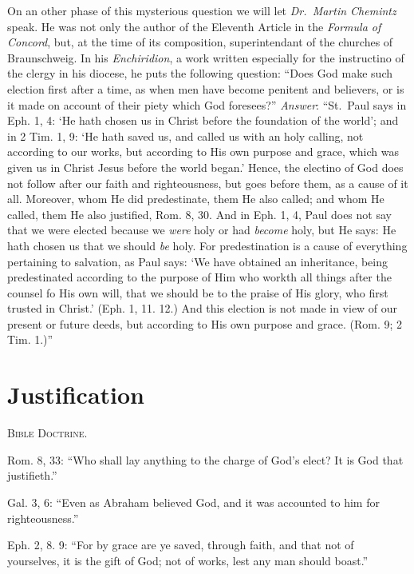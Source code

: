 \documentclass[
]{book}
\begin{document}
On an other phase of this mysterious question we will let \emph{Dr.~Martin Chemintz} speak. He was not only the author of the Eleventh Article in the \emph{Formula of Concord}, but, at the time of its composition, superintendant of the churches of Braunschweig. In his \emph{Enchiridion}, a work written especially for the instructino of the clergy in his diocese, he puts the following question: ``Does God make such election first after a time, as when men have become penitent and believers, or is it made on account of their piety which God foresees?'' \emph{Answer}: ``St.~Paul says in Eph. 1, 4: `He hath chosen us in Christ before the foundation of the world'; and in 2 Tim. 1, 9: `He hath saved us, and called us with an holy calling, not according to our works, but according to His own purpose and grace, which was given us in Christ Jesus before the world began.' Hence, the electino of God does not follow after our faith and righteousness, but goes before them, as a cause of it all. Moreover, whom He did predestinate, them He also called; and whom He called, them He also justified, Rom. 8, 30. And in Eph. 1, 4, Paul does not say that we were elected because we \emph{were} holy or had \emph{become} holy, but He says: He hath chosen us that we should \emph{be} holy. For predestination is a cause of everything pertaining to salvation, as Paul says: `We have obtained an inheritance, being predestinated according to the purpose of Him who workth all things after the counsel fo His own will, that we should be to the praise of His glory, who first trusted in Christ.' (Eph. 1, 11. 12.) And this election is not made in view of our present or future deeds, but according to His own purpose and grace. (Rom. 9; 2 Tim. 1.)''

\section{\texorpdfstring{Justification}{Justification}}\label{justification}

\begin{center}
\textsc{Bible Doctrine.}
\end{center}

Rom. 8, 33: ``Who shall lay anything to the charge of God's elect? It is God that justifieth.''

Gal. 3, 6: ``Even as Abraham believed God, and it was accounted to him for righteousness.''

Eph. 2, 8. 9: ``For by grace are ye saved, through faith, and that not of yourselves, it is the gift of God; not of works, lest any man should boast.''
\end{document}

